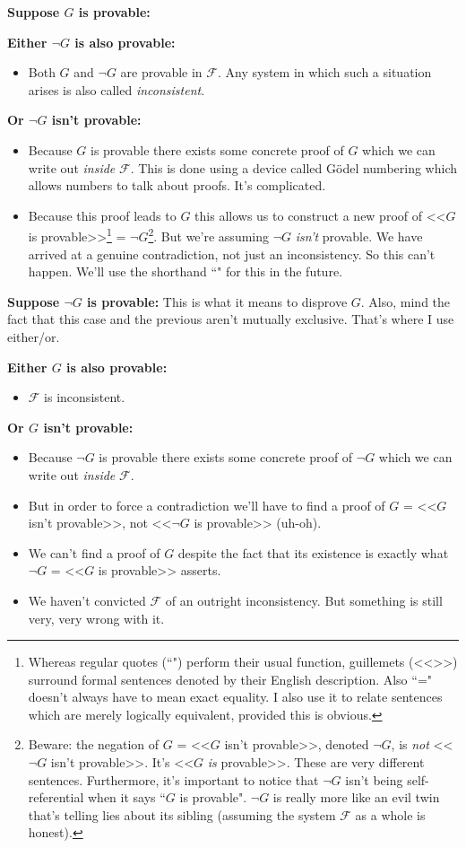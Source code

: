 \documentclass{article}
\theoremstyle{theorem}
\newcommand{\nameditem}[1]{\item\textbf{#1}}
\newcommand{\impl}{\item[$\Rightarrow$]}
\begin{document}
\begin{description}
\nameditem{Suppose $G$ is provable:}
\begin{description}
\nameditem{Either $\neg G$ is also provable:}
\begin{itemize}
\impl Both $G$ and $\neg G$ are provable in $\mathcal{F}$. Any system in which such a situation arises is also called \textit{inconsistent}.
\end{itemize}
\nameditem{Or $\neg G$ isn't provable:}
\begin{itemize}
\impl Because $G$ is provable there exists some concrete proof of $G$ which we can write out \textit{inside} $\mathcal{F}$. This is done using a device called Gödel numbering which allows numbers to talk about proofs. It's complicated.
\impl Because this proof leads to $G$ this allows us to construct a new proof of <<$G$ is provable>>\footnote{Whereas regular quotes (``") perform their usual function, guillemets (<<>>) surround formal sentences denoted by their English description. Also ``=" doesn't always have to mean exact equality. I also use it to relate sentences which are merely logically equivalent, provided this is obvious.} = $\neg G$\footnote{Beware: the negation of $G$ = <<$G$ isn't provable>>, denoted $\neg G$, is \textit{not} <<$\neg G$ isn't provable>>. It's <<$G$ \textit{is} provable>>. These are very different sentences. Furthermore, it's important to notice that $\neg G$ isn't being self-referential when it says ``$G$ is provable". $\neg G$ is really more like an evil twin that's telling lies about its sibling (assuming the system $\mathcal{F}$  as a whole is honest).}. But we're assuming $\neg G$ \textit{isn't} provable. We have arrived at a genuine contradiction, not just an inconsistency. So this can't happen. We'll use the shorthand ``\lightning" for this in the future.
\end{itemize}
\end{description}
\nameditem{Suppose $\neg G$ is provable:}
This is what it means to disprove $G$. Also, mind the fact that this case and the previous aren't mutually exclusive. That's where I use either/or.
\begin{description}
\nameditem{Either $G$ is also provable:}
\begin{itemize}
\impl $\mathcal{F}$ is inconsistent.
\end{itemize}
\nameditem{Or $G$ isn't provable:}
\begin{itemize}
\impl Because $\neg G$ is provable there exists some concrete proof of $\neg G$ which we can write out \textit{inside} $\mathcal{F}$.
\impl But in order to force a contradiction we'll have to find a proof of $G$ = <<$G$ isn't provable>>, not <<$\neg G$ is provable>> (uh-oh).
\impl We can't find a proof of $G$ despite the fact that its existence is exactly what $\neg G$ = <<$G$ is provable>> asserts.
\impl We haven't convicted $\mathcal{F}$ of an outright inconsistency. But something is still very, very wrong with it.
\end{itemize}
\end{description}
\end{description}
\end{document}
